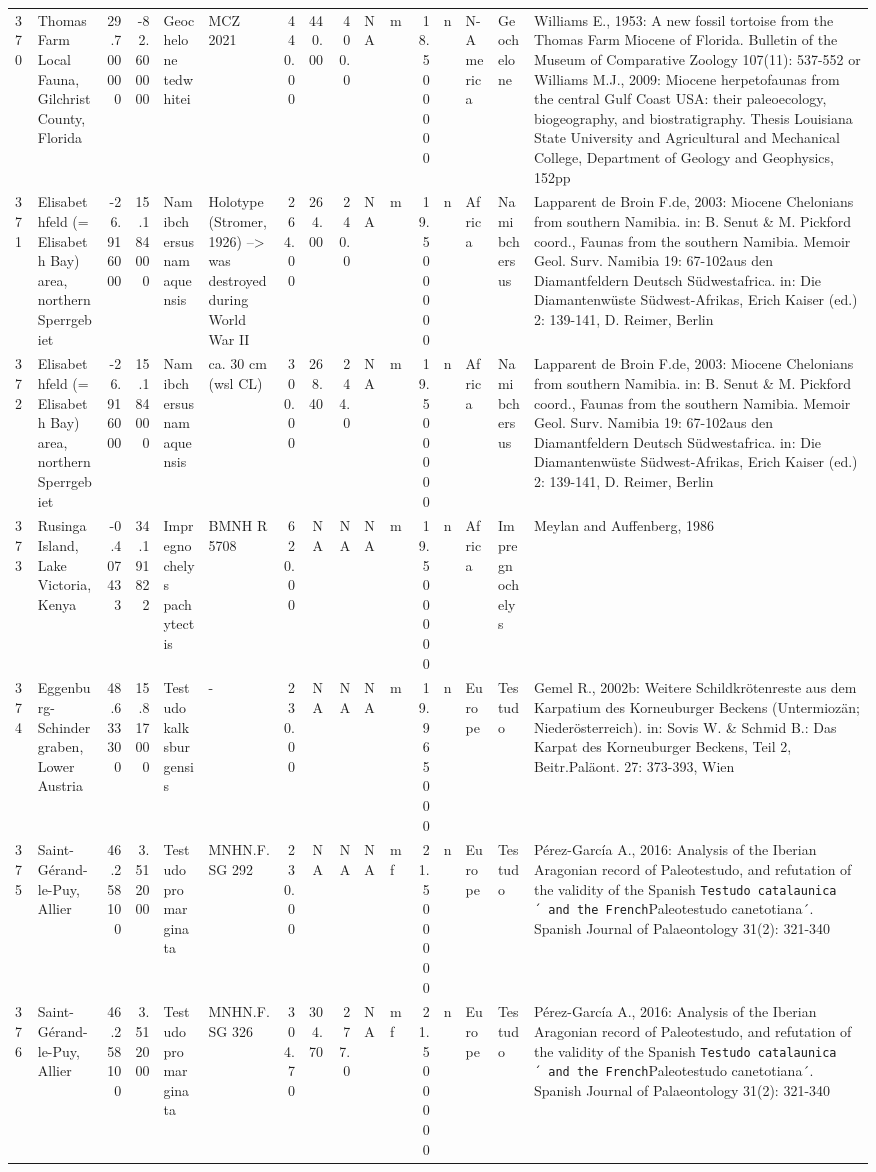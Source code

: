 \documentclass[]{article}
\begin{document}
\begin{longtable}[]{@{}llrrllrrrllrllll@{}}
370 & Thomas Farm Local Fauna, Gilchrist County, Florida & 29.700000 &
-82.600000 & Geochelone tedwhitei & MCZ 2021 & 440.00 & 440.00 & 400.0 &
NA & m & 18.500000 & n & N-America & Geochelone & Williams E., 1953: A
new fossil tortoise from the Thomas Farm Miocene of Florida. Bulletin of
the Museum of Comparative Zoology 107(11): 537-552 or Williams M.J.,
2009: Miocene herpetofaunas from the central Gulf Coast USA: their
paleoecology, biogeography, and biostratigraphy. Thesis Louisiana State
University and Agricultural and Mechanical College, Department of
Geology and Geophysics, 152pp\tabularnewline
371 & Elisabethfeld (= Elisabeth Bay) area, northern Sperrgebiet &
-26.916000 & 15.184000 & Namibchersus namaquensis & Holotype (Stromer,
1926) --\textgreater{} was destroyed during World War II & 264.00 &
264.00 & 240.0 & NA & m & 19.500000 & n & Africa & Namibchersus &
Lapparent de Broin F.de, 2003: Miocene Chelonians from southern Namibia.
in: B. Senut \& M. Pickford coord., Faunas from the southern Namibia.
Memoir Geol. Surv. Namibia 19: 67-102aus den Diamantfeldern Deutsch
Südwestafrica. in: Die Diamantenwüste Südwest-Afrikas, Erich Kaiser
(ed.) 2: 139-141, D. Reimer, Berlin\tabularnewline
372 & Elisabethfeld (= Elisabeth Bay) area, northern Sperrgebiet &
-26.916000 & 15.184000 & Namibchersus namaquensis & ca. 30 cm (wsl CL) &
300.00 & 268.40 & 244.0 & NA & m & 19.500000 & n & Africa & Namibchersus
& Lapparent de Broin F.de, 2003: Miocene Chelonians from southern
Namibia. in: B. Senut \& M. Pickford coord., Faunas from the southern
Namibia. Memoir Geol. Surv. Namibia 19: 67-102aus den Diamantfeldern
Deutsch Südwestafrica. in: Die Diamantenwüste Südwest-Afrikas, Erich
Kaiser (ed.) 2: 139-141, D. Reimer, Berlin\tabularnewline
373 & Rusinga Island, Lake Victoria, Kenya & -0.407433 & 34.191822 &
Impregnochelys pachytectis & BMNH R 5708 & 620.00 & NA & NA & NA & m &
19.500000 & n & Africa & Impregnochelys & Meylan and Auffenberg,
1986\tabularnewline
374 & Eggenburg-Schindergraben, Lower Austria & 48.633300 & 15.817000 &
Testudo kalksburgensis & - & 230.00 & NA & NA & NA & m & 19.965000 & n &
Europe & Testudo & Gemel R., 2002b: Weitere Schildkrötenreste aus dem
Karpatium des Korneuburger Beckens (Untermiozän; Niederösterreich). in:
Sovis W. \& Schmid B.: Das Karpat des Korneuburger Beckens, Teil 2,
Beitr.Paläont. 27: 373-393, Wien\tabularnewline
375 & Saint-Gérand-le-Puy, Allier & 46.258100 & 3.512000 & Testudo
promarginata & MNHN.F. SG 292 & 230.00 & NA & NA & NA & mf & 21.500000 &
n & Europe & Testudo & Pérez-García A., 2016: Analysis of the Iberian
Aragonian record of Paleotestudo, and refutation of the validity of the
Spanish \texttt{Testudo\ catalaunica´\ and\ the\ French}Paleotestudo
canetotiana´. Spanish Journal of Palaeontology 31(2):
321-340\tabularnewline
376 & Saint-Gérand-le-Puy, Allier & 46.258100 & 3.512000 & Testudo
promarginata & MNHN.F. SG 326 & 304.70 & 304.70 & 277.0 & NA & mf &
21.500000 & n & Europe & Testudo & Pérez-García A., 2016: Analysis of
the Iberian Aragonian record of Paleotestudo, and refutation of the
validity of the Spanish
\texttt{Testudo\ catalaunica´\ and\ the\ French}Paleotestudo
canetotiana´. Spanish Journal of Palaeontology 31(2):
321-340\tabularnewline
\bottomrule
\end{longtable}
\end{document}
